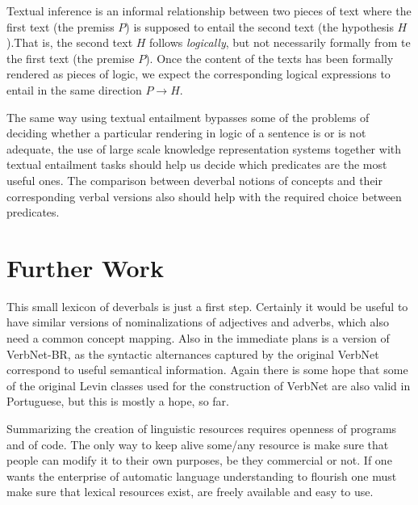 \documentclass{article}
\begin{document}
Textual inference is an informal relationship between two pieces of
text where the first text (the premiss $P$) is supposed to entail the
second text (the hypothesis $H$).That is, the second text $H$ follows
\emph{logically}, but not necessarily formally from te the first text
(the premise $P$). Once the content of the texts has been formally
rendered as pieces of logic, we expect the corresponding logical
expressions to entail in the same direction $P\to H$.

The same way using textual entailment bypasses some of the problems of
deciding whether a particular rendering in logic of a sentence is or
is not adequate, the use of large scale knowledge representation
systems together with textual entailment tasks should help us decide
which predicates are the most useful ones. The comparison between
deverbal notions of concepts and their corresponding verbal versions
also should help with the required choice between predicates.
 

\section{Further Work}

This small lexicon of deverbals is just a first step. Certainly it
would be useful to have similar versions of nominalizations of
adjectives and adverbs, which also need a common concept mapping. Also
in the immediate plans is a version of VerbNet-BR, as the syntactic
alternances captured by the original VerbNet~\cite{verbnet} correspond
to useful semantical information. Again there is some hope that some
of the original Levin classes used for the construction of VerbNet are
also valid in Portuguese, but this is mostly a hope, so far.

Summarizing the creation of linguistic resources requires openness of
programs and of code. The only way to keep alive some/any resource is
make sure that people can modify it to their own purposes, be they
commercial or not. If one wants the enterprise of automatic language
understanding to flourish one must make sure that lexical resources
exist, are freely available and easy to use.



\end{document}
